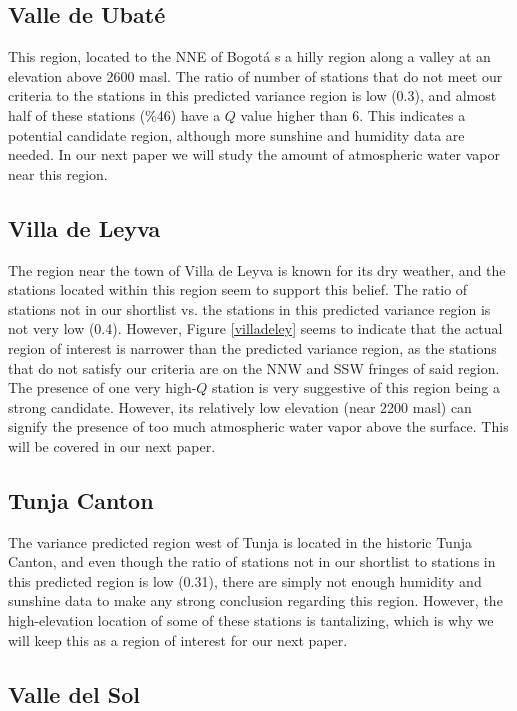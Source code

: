 \documentclass[12pt]{iopart}
\begin{document}
\subsection{Valle de Ubat\'e}

This region, located to the NNE of Bogot\'a s a hilly region along a valley at an elevation above 2600 masl. The ratio of number of stations that do not meet our criteria to the stations in this predicted variance region is low (0.3), and almost half of these stations (\%46) have a $Q$ value higher than 6. This indicates a potential candidate region, although more  sunshine and humidity data are needed. In our next paper we will study the amount of atmospheric water vapor near this region.

\subsection{Villa de Leyva}

The region near the town of Villa de Leyva is known for its dry weather, and the stations located within this region seem to support this belief. The ratio of stations not in our shortlist vs. the stations in this predicted variance region is not very low (0.4). However, Figure \ref{villadeley} seems to indicate that the actual region of interest is narrower than the predicted variance region, as the stations that do not satisfy our criteria are on the NNW and SSW fringes of said region. The presence of one very high-$Q$ station is very suggestive of this region being a strong candidate. However, its relatively low elevation (near 2200 masl) can signify the presence of too much atmospheric water vapor above the surface. This will be covered in our next paper.

\subsection{Tunja Canton}

The variance predicted region west of Tunja is located in the historic Tunja Canton, and even though the ratio of stations not in our shortlist to stations in this predicted region is low (0.31), there are simply not enough humidity and sunshine data to make any strong conclusion regarding this region. However, the high-elevation location of some of these stations is tantalizing, which is why we will keep this as a region of interest for our next paper.


\subsection{Valle del Sol}
\end{document}
